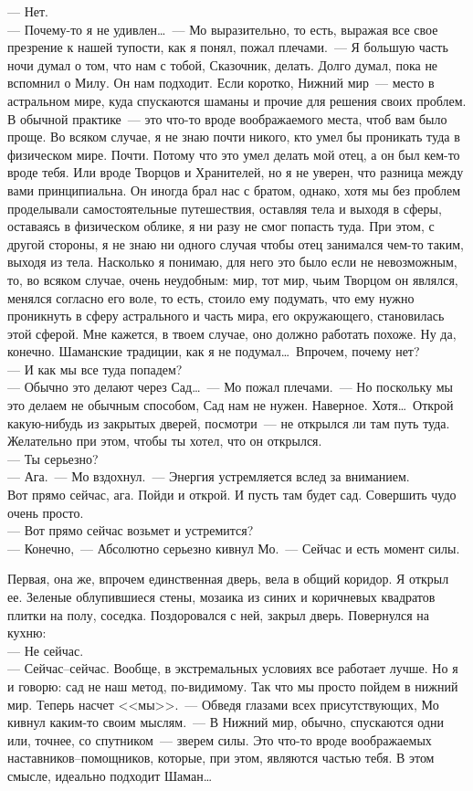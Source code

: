 --- Нет.\\
--- Почему-то я не удивлен\ldots~--- Мо выразительно, то есть, выражая все свое 
презрение к нашей тупости, как я понял, пожал плечами.~--- Я большую часть ночи 
думал о том, что нам с тобой, Сказочник, делать. Долго думал, пока не вспомнил 
о Милу. Он нам подходит. Если коротко, Нижний мир~--- место в астральном мире, 
куда спускаются шаманы и прочие для решения своих проблем. В обычной практике~--- 
это что-то вроде воображаемого места, чтоб вам было проще. Во всяком случае, я не 
знаю почти никого, кто умел бы проникать туда в физическом мире. Почти. Потому 
что это умел делать мой отец, а он был кем-то вроде тебя. Или вроде Творцов и 
Хранителей, но я не уверен, что разница между вами принципиальна. Он иногда 
брал нас с братом, однако, хотя мы без проблем проделывали самостоятельные 
путешествия, оставляя тела и выходя в сферы, оставаясь в физическом облике, я 
ни разу не смог попасть туда. При этом, с другой стороны, я не знаю ни одного 
случая чтобы отец занимался чем-то таким, выходя из тела. Насколько я понимаю, 
для него это было если не невозможным, то, во всяком случае, очень неудобным: 
мир, тот мир, чьим Творцом он являлся, менялся согласно его воле, то есть, 
стоило ему подумать, что ему нужно проникнуть в сферу астрального и часть мира, 
его окружающего, становилась этой сферой. Мне кажется, в твоем случае, оно 
должно работать похоже. Ну да, конечно. Шаманские традиции, как я не 
подумал\ldots\ 
Впрочем, почему нет?\\
--- И как мы все туда попадем?\\
--- Обычно это делают через Сад\ldots~--- Мо пожал плечами.~--- Но поскольку мы 
это делаем не обычным способом, Сад нам не нужен. Наверное. Хотя\ldots\ Открой 
какую-нибудь из закрытых дверей, посмотри~--- не открылся ли там путь туда. 
Желательно при этом, чтобы ты хотел, что он открылся.\\
--- Ты серьезно?\\
--- Ага.~--- Мо вздохнул.~--- Энергия устремляется вслед за вниманием.\\
Вот прямо сейчас, ага. Пойди и открой. И пусть там будет сад. Совершить чудо 
очень просто.\\
--- Вот прямо сейчас возьмет и устремится?\\
--- Конечно,~--- Абсолютно серьезно кивнул Мо.~--- Сейчас и есть момент силы.

Первая, она же, впрочем единственная дверь, вела в общий коридор. Я открыл ее. 
Зеленые облупившиеся стены, мозаика из синих и коричневых квадратов плитки на 
полу, соседка. Поздоровался с ней, закрыл дверь. Повернулся на кухню:\\
--- Не сейчас.\\
--- Сейчас--сейчас. Вообще, в экстремальных условиях все работает лучше. Но я и 
говорю: сад не наш метод, по-видимому. Так что мы просто пойдем в нижний мир. 
Теперь насчет <<мы>>.~--- Обведя глазами всех присутствующих, Мо кивнул 
каким-то своим мыслям.~--- В Нижний мир, обычно, спускаются одни или, точнее, со 
спутником~--- зверем силы. Это что-то вроде воображаемых наставников--помощников, которые, 
при этом, являются частью тебя. В этом смысле, идеально подходит Шаман\ldots

